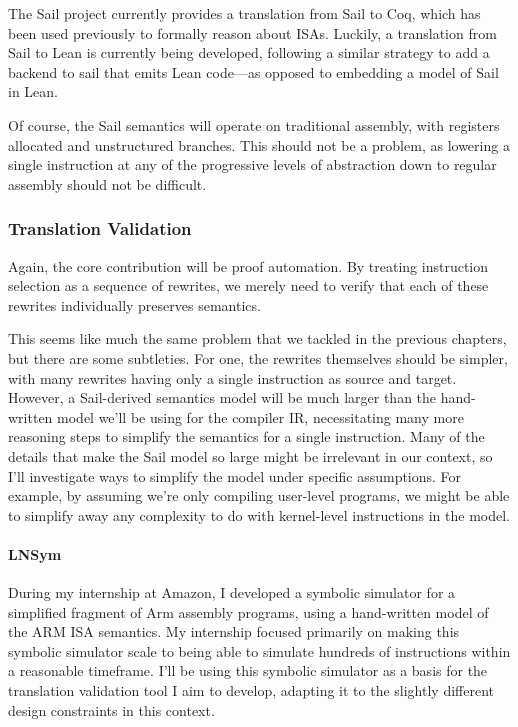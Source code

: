 The Sail project currently provides a translation from Sail to Coq,
which has been used previously to formally reason about ISAs. Luckily, a
translation from Sail to Lean is currently being developed, following a
similar strategy to add a backend to sail that emits Lean code---as
opposed to embedding a model of Sail in Lean.

Of course, the Sail semantics will operate on traditional assembly, with
registers allocated and unstructured branches. This should not be a
problem, as lowering a single instruction at any of the progressive
levels of abstraction down to regular assembly should not be difficult.

\subsubsection{Translation Validation}\label{translation-validation}

Again, the core contribution will be proof automation. By treating
instruction selection as a sequence of rewrites, we merely need to
verify that each of these rewrites individually preserves semantics.

This seems like much the same problem that we tackled in the previous
chapters, but there are some subtleties. For one, the rewrites
themselves should be simpler, with many rewrites having only a single
instruction as source and target. However, a Sail-derived semantics
model will be much larger than the hand-written model we'll be using for
the compiler IR, necessitating many more reasoning steps to simplify the
semantics for a single instruction. Many of the details that make the
Sail model so large might be irrelevant in our context, so I'll
investigate ways to simplify the model under specific assumptions. For
example, by assuming we're only compiling user-level programs, we might
be able to simplify away any complexity to do with kernel-level
instructions in the model.

\paragraph{LNSym}\label{lnsym}

During my internship at Amazon, I developed a symbolic simulator for a
simplified fragment of Arm assembly programs, using a hand-written model
of the ARM ISA semantics. My internship focused primarily on making this
symbolic simulator scale to being able to simulate hundreds of
instructions within a reasonable timeframe. I'll be using this symbolic
simulator as a basis for the translation validation tool I aim to
develop, adapting it to the slightly different design constraints in
this context.

